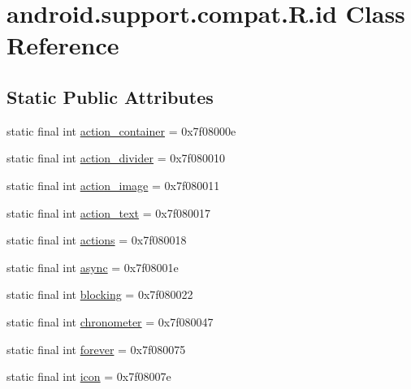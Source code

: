 \hypertarget{classandroid_1_1support_1_1compat_1_1_r_1_1id}{}\section{android.\+support.\+compat.\+R.\+id Class Reference}
\label{classandroid_1_1support_1_1compat_1_1_r_1_1id}
\subsection*{Static Public Attributes}
\begin{DoxyCompactItemize}
\item 
static final int \mbox{\hyperlink{classandroid_1_1support_1_1compat_1_1_r_1_1id_a7f80213ff3a91ef547ef997845e107fa}{action\+\_\+container}} = 0x7f08000e
\item 
static final int \mbox{\hyperlink{classandroid_1_1support_1_1compat_1_1_r_1_1id_a88be636aa39ce1c191888969702df488}{action\+\_\+divider}} = 0x7f080010
\item 
static final int \mbox{\hyperlink{classandroid_1_1support_1_1compat_1_1_r_1_1id_a70b58cd3ef96e20e98a2c558648a9df6}{action\+\_\+image}} = 0x7f080011
\item 
static final int \mbox{\hyperlink{classandroid_1_1support_1_1compat_1_1_r_1_1id_a4c632b55a9592c7a9bccd823efbfab93}{action\+\_\+text}} = 0x7f080017
\item 
static final int \mbox{\hyperlink{classandroid_1_1support_1_1compat_1_1_r_1_1id_aa1242e1c24112a4831977220dc8f7da4}{actions}} = 0x7f080018
\item 
static final int \mbox{\hyperlink{classandroid_1_1support_1_1compat_1_1_r_1_1id_a0b32e72d27792d595387386a89e994b6}{async}} = 0x7f08001e
\item 
static final int \mbox{\hyperlink{classandroid_1_1support_1_1compat_1_1_r_1_1id_ab36e5d91fa3344d7b8a7dc7c5b762da5}{blocking}} = 0x7f080022
\item 
static final int \mbox{\hyperlink{classandroid_1_1support_1_1compat_1_1_r_1_1id_a8a7fe10d3cc006c6e74a4f87a881ab2f}{chronometer}} = 0x7f080047
\item 
static final int \mbox{\hyperlink{classandroid_1_1support_1_1compat_1_1_r_1_1id_a94bea61e1bb09bcae816f3b5f0815f20}{forever}} = 0x7f080075
\item 
static final int \mbox{\hyperlink{classandroid_1_1support_1_1compat_1_1_r_1_1id_ab366864ddd2e01f97092f1b825cc943d}{icon}} = 0x7f08007e
\item 

\end{DoxyCompactItemize}
